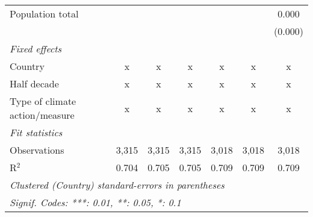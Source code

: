 \begin{tabular}{lcccccc}
   Population total                           &         &               &               &               &               & 0.000\\   
                                              &         &               &               &               &               & (0.000)\\   
   \emph{Fixed effects}\\
   Country                                    & x       & x             & x             & x             & x             & x\\  
   Half decade                                & x       & x             & x             & x             & x             & x\\  
   Type of climate action/measure             & x       & x             & x             & x             & x             & x\\  
   \midrule \emph{Fit statistics}\\
   Observations                               & 3,315   & 3,315         & 3,315         & 3,018         & 3,018         & 3,018\\  
   R$^2$                                      & 0.704   & 0.705         & 0.705         & 0.709         & 0.709         & 0.709\\  
   \midrule
   \multicolumn{7}{l}{\emph{Clustered (Country) standard-errors in parentheses}}\\
   \multicolumn{7}{l}{\emph{Signif. Codes: ***: 0.01, **: 0.05, *: 0.1}}\\
\end{tabular}
\par\endgroup


